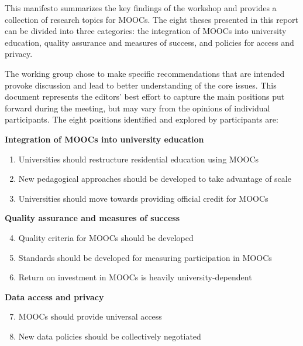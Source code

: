 
This manifesto summarizes the key findings of the workshop and provides
a collection of research topics for MOOCs. The eight theses presented in
this report can be divided into three categories: the integration of
MOOCs into university education, quality assurance and measures of
success, and policies for access and privacy.


The working group chose to make specific recommendations that are intended provoke discussion 
and lead to better understanding of the core issues. This document represents the
editors' best effort to capture the main positions put forward during the meeting,
but may vary from the opinions of individual participants.
The eight positions identified and explored by participants are:

\vspace{1ex}
\textbf{Integration of MOOCs into university education}

\begin{enumerate}

\item Universities should restructure residential education using
MOOCs

\item New pedagogical approaches should be developed to take
advantage of scale

\item Universities should move towards providing official
credit for MOOCs

\end{enumerate}

\textbf{Quality assurance and measures of success}

\begin{enumerate}
\setcounter{enumi}{3}

\item Quality criteria for MOOCs should be developed

\item Standards should be developed for measuring
  participation in MOOCs

\item Return on investment in MOOCs is heavily university-dependent

\end{enumerate}

\textbf{Data access and privacy}

\begin{enumerate}
\setcounter{enumi}{6}

\item MOOCs should provide universal access

\item New data
policies should be collectively negotiated

\end{enumerate}



